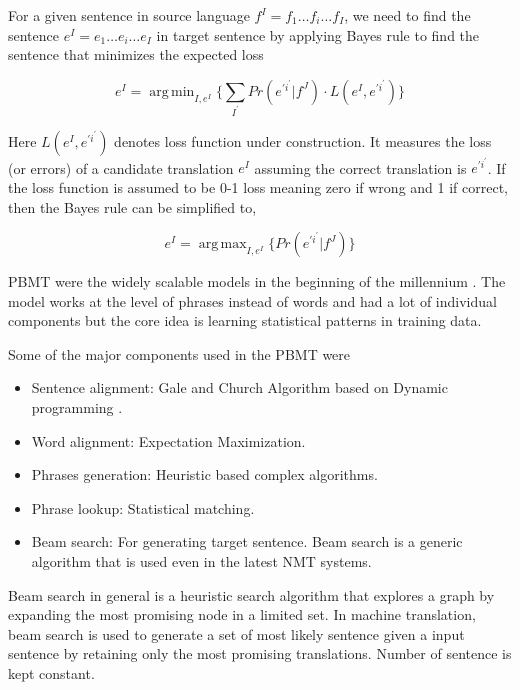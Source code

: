 \documentclass[a4paper]{article}
\DeclareMathOperator*{\argmin}{arg\,min}
\DeclareMathOperator*{\argmax}{arg\,max}
\begin{document}
For a given sentence in source language $f^{I} = f_1\ldots f_i\ldots f_{I} $, we
need to find the sentence $e^{I} = e_1\ldots e_i\ldots e_{I}$ in target sentence
by applying Bayes rule to find the sentence that minimizes the expected loss


\begin{equation*}
e^{I} =  \argmin_{I,e^{I}} \Bigg\{
  \sum_{I^{'} } Pr(e^{\prime i^\prime} | f^J) \cdot L(e^I, e^{\prime i^\prime})
\Bigg\}
\end{equation*}


Here $L (e^I, e^{\prime i^\prime})$ denotes loss function under construction. It
measures  the loss  (or errors) of a candidate translation $e^{I}$ assuming  the
correct translation is $e^{\prime i^\prime}$. If the loss function is assumed to
be  0-1 loss meaning zero  if wrong and 1 if correct, then the Bayes rule can be
simplified to,


\begin{equation*}
  e^{I} = \argmax_{I,e^{I}} \Bigg\{Pr (e^{\prime i^\prime} | f^J) \Bigg\}
\end{equation*}


PBMT  were  the widely  scalable models  in  the  beginning  of  the  millennium
\cite{koehn2003statistical}. The model works  at the level of phrases instead of
words and  had  a lot of individual components  but  the  core idea is  learning
statistical patterns in training data.

Some of the major components used in the PBMT were


\begin{itemize}
  \item Sentence  alignment:   Gale   and  Church  Algorithm  based  on  Dynamic
        programming \cite{lewis1994sequential}.
  \item Word alignment: Expectation Maximization.
  \item Phrases generation: Heuristic based complex algorithms.
  \item Phrase lookup: Statistical matching.
  \item Beam search:  For  generating target sentence.  Beam search is a generic
        algorithm that is used even in the latest NMT systems.
\end{itemize}


Beam search in general is a heuristic search  algorithm that explores a graph by
expanding the most promising node in a limited set. In machine translation, beam
search is used to generate  a set of most likely sentence given a input sentence
by retaining  only the most promising  translations. Number of sentence  is kept
constant.
\end{document}

